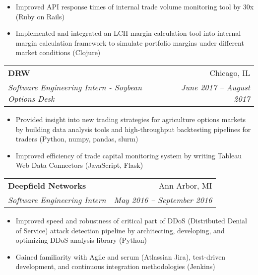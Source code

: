 \documentclass[letterpaper,11pt]{article}
\makeatletter
\newcommand{\resitem}[1]{\item #1 \vspace{-2pt}}
\newcommand{\ressubheading}[4]{
\begin{tabular*}{6.875in}{l@{\extracolsep{\fill}}r}
		\textbf{#1} & #2 \\
		\textit{#3} & \textit{#4} \\
\end{tabular*}\vspace{-6pt}}
\renewcommand{\footnotesize}{\fontsize{10pt}{11pt}\selectfont}
\makeatother
\begin{document}
\begin{description}
			{	
				\footnotesize
				\begin{itemize}
					\resitem{Improved API response times of internal trade volume monitoring tool by 30x (Ruby on Rails)}
					\resitem{Implemented and integrated an LCH margin calculation tool into internal margin calculation framework to simulate portfolio margins under different market conditions (Clojure)}
				\end{itemize}
			}
			\item 
			\ressubheading{DRW}{Chicago, IL}
			{Software Engineering Intern - Soybean Options Desk}{June 2017 -- August 2017}
			{	
				\footnotesize
				\begin{itemize}
					\resitem{Provided insight into new trading strategies for agriculture options markets by building data analysis tools and high-throughput backtesting pipelines for traders  (Python, numpy, pandas, slurm)}
					\resitem{Improved efficiency of trade capital monitoring system by writing Tableau Web Data Connectors  (JavaScript, Flask)}
				\end{itemize}
			}
			\item 
			\ressubheading{Deepfield Networks}{Ann Arbor, MI}
			{Software Engineering Intern}{May 2016 -- September 2016}
			{	
				\footnotesize
				\begin{itemize}
					\resitem{Improved speed and robustness of critical part of DDoS (Distributed Denial of Service) attack detection pipeline by architecting, developing, and optimizing DDoS analysis library (Python)}
					\resitem{Gained familiarity with Agile and scrum (Atlassian Jira), test-driven development, and continuous integration methodologies (Jenkins)}
				\end{itemize}
			}						
		\end{description}  %
						
\end{document}
